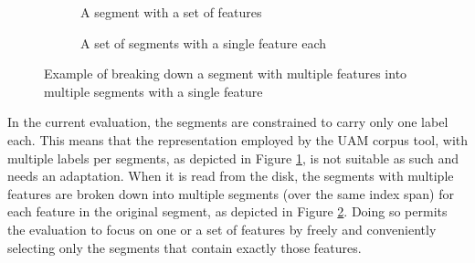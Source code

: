     \begin{figure}[!h]
        \centering
        \begin{subfigure}[b]{0.47\textwidth}
            \centering
            \caption{A segment with a set of features}
            \label{fig:segment-multiple}
        \end{subfigure}
        \begin{subfigure}[b]{0.47\textwidth}
            \centering
            \caption{A set of segments with a single feature each}
            \label{fig:segment-simple}
        \end{subfigure}
        \caption{Example of breaking down a segment with multiple features into multiple segments with a single feature}
        \label{fig:segment-breackdown}
    \end{figure}

    In the current evaluation, the segments are constrained to carry only one label each. This means that the representation employed by the UAM corpus tool, with multiple labels per segments, as depicted in Figure \ref{fig:segment-multiple}, is not suitable as such and needs an adaptation. When it is read from the disk, the segments with multiple features are broken down into multiple segments (over the same index span) for each feature in the original segment, as depicted in Figure \ref{fig:segment-simple}. Doing so permits the evaluation to focus on one or a set of features by freely and conveniently selecting only the segments that contain exactly those features.
    
